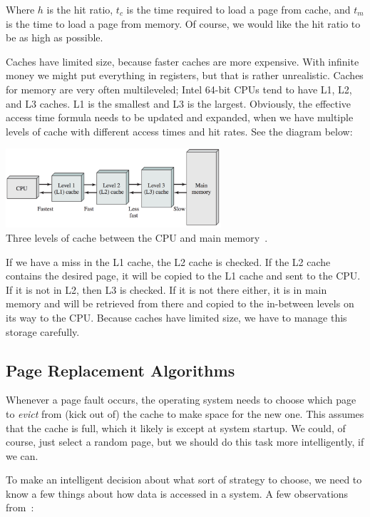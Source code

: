 Where $h$ is the hit ratio, $t_{c}$ is the time required to load a page from cache, and $t_{m}$ is the time to load a page from memory. Of course, we would like the hit ratio to be as high as possible. 

Caches have limited size, because faster caches are more expensive. With infinite money we might put everything in registers, but that is rather unrealistic. Caches for memory are very often multileveled; Intel 64-bit CPUs tend to have L1, L2, and L3 caches. L1 is the smallest and L3 is the largest. Obviously, the effective access time formula needs to be updated and expanded, when we have multiple levels of cache with different access times and hit rates. See the diagram below:

\begin{center}
\includegraphics[width=0.6\textwidth]{images/caches.png}\\
Three levels of cache between the CPU and main memory~\cite{osi}.
\end{center}

If we have a miss in the L1 cache, the L2 cache is checked. If the L2 cache contains the desired page, it will be copied to the L1 cache and sent to the CPU. If it is not in L2, then L3 is checked. If it is not there either, it is in main memory and will be retrieved from there and copied to the in-between levels on its way to the CPU. Because caches have limited size, we have to manage this storage carefully.

\subsection*{Page Replacement Algorithms}
Whenever a page fault occurs, the operating system needs to choose which page to \textit{evict} from (kick out of) the cache to make space for the new one. This assumes that the cache is full, which it likely is except at system startup. We could, of course, just select a random page, but we should do this task more intelligently, if we can.

To make an intelligent decision about what sort of strategy to choose, we need to know a few things about how data is accessed in a system. A few observations from~\cite{mte241}:


